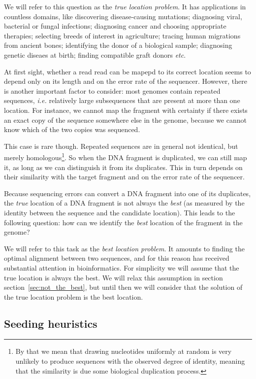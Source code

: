 \documentclass{article}
\begin{document}
We will refer to this question as the \emph{true location problem}.
It has applications in countless domains, like discovering
disease-causing mutations; diagnosing viral, bacterial or fungal
infections; diagnosing cancer and choosing appropriate therapies;
selecting breeds of interest in agriculture; tracing human migrations from
ancient bones; identifying the donor of a biological sample; diagnosing
genetic diseaes at birth; finding compatible graft donors \textit{etc}.

At first sight, whether a read read can be mapepd to its correct location
seems to depend only on its length and on the error rate of the sequencer.
However, there is another important factor to consider: most genomes
contain repeated sequences, \textit{i.e.} relatively large subsequences
that are present at more than one location. For instance, we cannot map
the fragment with certainty if there exists an exact copy of the sequence
somewhere else in the genome, because we cannot know which of the two
copies was sequenced.

This case is rare though. Repeated sequences are in general not identical,
but merely homologous\footnote{By that we mean that drawing nucleotides
uniformly at random is very unlikely to produce sequences with the
observed degree of identity, meaning that the similarity is due some
biological duplication process.}. So when the DNA fragment is duplicated,
we can still map it, as long as we can distinguish it from its duplicates.
This in turn depends on their similarity with the target fragment and on
the error rate of the sequencer.

Because sequencing errors can convert a DNA fragment into one of its
duplicates, the \emph{true} location of a DNA fragment is not always the
\emph{best} (as measured by the identity between the sequence and the
candidate location). This leads to the following question: how can we
identify the \emph{best} location of the fragment in the genome? 

We will refer to this task as the \emph{best location problem}. It amounts
to finding the optimal alignment between two sequences, and for this
reason has received substantial attention in bioinformatics. For
simplicity we will assume that the true location is always the best. We
will relax this assumption in section section~\ref{sec:not_the_best}, but
until then we will consider that the solution of the true location problem
is the best location.

\subsection{Seeding heuristics}
\label{sec:seedheur}
\end{document}

